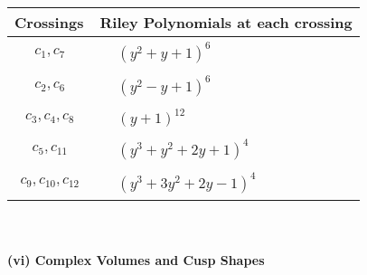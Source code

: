 \documentclass[1p]{elsarticle_modified}
\theoremstyle{definition}
\begin{document}
\begin{tabular}{m{50pt}|m{274pt}}
Crossings & \hspace{64pt}Riley Polynomials at each crossing \\
\hline $$\begin{aligned}c_{1},c_{7}\end{aligned}$$&$\begin{aligned}
&(y^2+y+1)^6
\end{aligned}$\\
\hline $$\begin{aligned}c_{2},c_{6}\end{aligned}$$&$\begin{aligned}
&(y^2- y+1)^6
\end{aligned}$\\
\hline $$\begin{aligned}c_{3},c_{4},c_{8}\end{aligned}$$&$\begin{aligned}
&(y+1)^{12}
\end{aligned}$\\
\hline $$\begin{aligned}c_{5},c_{11}\end{aligned}$$&$\begin{aligned}
&(y^3+y^2+2 y+1)^4
\end{aligned}$\\
\hline $$\begin{aligned}c_{9},c_{10},c_{12}\end{aligned}$$&$\begin{aligned}
&(y^3+3 y^2+2 y-1)^4
\end{aligned}$\\
\hline
\end{tabular}\\~\\
\newpage\flushleft \textbf{(vi) Complex Volumes and Cusp Shapes}
\end{document}
